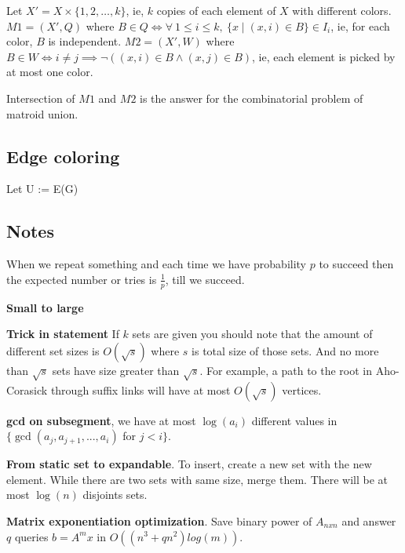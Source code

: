 \documentclass[a4paper,10pt,oneside]{article}
\begin{document}
\begin{multicols}{2}
Let $X' = X \times \{1, 2, \dots, k\}$, ie, $k$ copies of each element of $X$ with different colors. $M1 = (X', Q)$ where $B \in Q \iff \forall ~1 \le i \le k, ~\{x\mid (x, i) \in B\} \in I_i$, ie, for each color, $B$ is independent. $M2 = (X', W)$ where $B \in W \iff i \not= j \implies \lnot((x, i) \in B \land (x, j) \in B)$, ie, each element is picked by at most one color.

Intersection of $M1$ and $M2$ is the answer for the combinatorial problem of matroid union.
\subsection{Edge coloring}

\begin{algorithm}[H]
\SetAlgoLined
{}
Let U := E(G)\;
\end{algorithm}

\subsection{Notes}
When we repeat something and each time we have probability $p$ to succeed then the expected number or tries is $\frac{1}{p}$, till we succeed.

\textbf{Small to large}

\textbf{Trick in statement} If $k$ sets are given you should note that the amount of different set sizes is $O(\sqrt{s})$ where $s$ is total size of those sets. And no more than $\sqrt{s}$ sets have size greater than $\sqrt{s}$. For example, a path to the root in Aho-Corasick through suffix links will have at most $O(\sqrt{s})$ vertices.

\textbf{gcd on subsegment}, we have at most $\log(a_i)$ different values in $\{\gcd(a_j, a_{j+1}, ..., a_i)$ for $j < i\}$.

\textbf{From static set to expandable}. To insert, create a new set with the new element. While there are two sets with same size, merge them. There will be at most $\log(n)$ disjoints sets.

\textbf{Matrix exponentiation optimization}. Save binary power of $A_{nxn}$ and answer $q$ queries $b = A^mx$ in $O((n^3 + qn^2)log(m))$.


\end{multicols}
\end{document}
